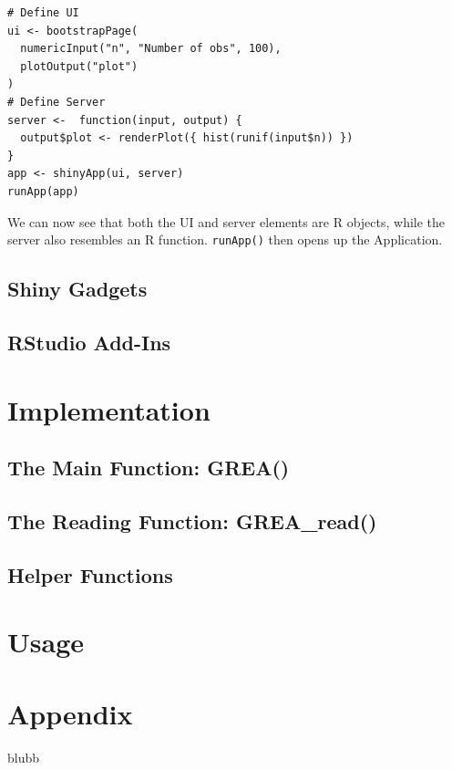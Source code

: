\documentclass[12pt]{article} %
\newcommand{\li}{\lstinline}
\begin{document}
\begin{lstlisting}
# Define UI
ui <- bootstrapPage(
  numericInput("n", "Number of obs", 100),
  plotOutput("plot")
)
# Define Server
server <-  function(input, output) {
  output$plot <- renderPlot({ hist(runif(input$n)) })
}
app <- shinyApp(ui, server)
runApp(app)

\end{lstlisting}

We can now see that both the UI and server elements are R objects, while the server also resembles an R function. \li{runApp()} then opens up the Application.

\subsection{Shiny Gadgets}
\subsection{RStudio Add-Ins}
\section{Implementation}
\subsection{The Main Function: \textrm{GREA()}}
\subsection{The Reading Function: \textrm{GREA\_read()}}
\subsection{Helper Functions}
\section{Usage}


\clearpage

\section*{Appendix}

\begin{thebibliography}{59}
\begin{singlespace}

 blubb
\end{singlespace}
\end{thebibliography}
\end{document}
